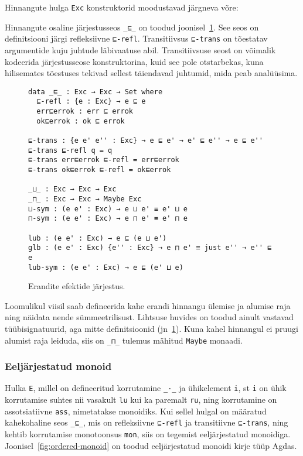 \documentclass[a4paper,12pt]{article}
\begin{document}
Hinnangute hulga {\tt Exc} konstruktorid moodustavad järgneva võre:
\begin{center}
\end{center}
Hinnangute osaline järjestusseos {\tt _⊑_} on toodud joonisel~\ref{fig:exc.ord}.
See seos on definitsiooni järgi refleksiivne {\tt ⊑-refl}.
Transitiivsus {\tt ⊑-trans} on tõestatav argumentide kuju juhtude läbivaatuse abil.
Transitiivsuse seost on võimalik kodeerida järjestusseose konstruktorina, kuid see pole otstarbekas,
kuna hilisemates tõestuses tekivad sellest täiendavad juhtumid, mida peab analüüsima.

\begin{figure}
  \begin{BVerbatim}
data _⊑_ : Exc → Exc → Set where
  ⊑-refl : {e : Exc} → e ⊑ e
  err⊑errok : err ⊑ errok
  ok⊑errok : ok ⊑ errok
  
⊑-trans : {e e' e'' : Exc} → e ⊑ e' → e' ⊑ e'' → e ⊑ e''
⊑-trans ⊑-refl q = q
⊑-trans err⊑errok ⊑-refl = err⊑errok
⊑-trans ok⊑errok ⊑-refl = ok⊑errok

_⊔_ : Exc → Exc → Exc
_⊓_ : Exc → Exc → Maybe Exc
⊔-sym : (e e' : Exc) → e ⊔ e' ≡ e' ⊔ e
⊓-sym : (e e' : Exc) → e ⊓ e' ≡ e' ⊓ e

lub : (e e' : Exc) → e ⊑ (e ⊔ e')
glb : (e e' : Exc) {e'' : Exc} → e ⊓ e' ≡ just e'' → e'' ⊑ e
lub-sym : (e e' : Exc) → e ⊑ (e' ⊔ e)
  \end{BVerbatim}
  \caption{Erandite efektide järjestus.}
  \label{fig:exc.ord}
\end{figure}
Loomulikul viisil saab defineerida kahe erandi hinnangu ülemise ja alumise raja ning näidata nende sümmeetrilisust.
Lihtsuse huvides on toodud ainult vastavad tüübisignatuurid, aga mitte definitsioonid (jn~\ref{fig:exc.ord}).
Kuna kahel hinnangul ei pruugi alumist raja leiduda, siis on {\tt _⊓_} tulemus mähitud {\tt Maybe} monaadi.

\subsubsection{Eeljärjestatud monoid}\label{sssec:ordered-monoid}
Hulka {\tt E}, millel on defineeritud korrutamine {\tt _·_} ja ühikelement {\tt i},
st {\tt i} on ühik korrutamise suhtes nii vasakult {\tt lu} kui ka paremalt {\tt ru},
ning korrutamine on assotsiatiivne {\tt ass}, nimetatakse monoidiks.
Kui sellel hulgal on määratud kahekohaline seos {\tt _⊑_},
mis on refleksiivne {\tt ⊑-refl} ja transitiivne {\tt ⊑-trans},
ning kehtib korrutamise monotoonsus {\tt mon},
siis on tegemist eeljärjestatud monoidiga.
Joonisel~\ref{fig:ordered-monoid} on toodud eeljärjestatud monoidi kirje tüüp Agdas.
\end{document}
